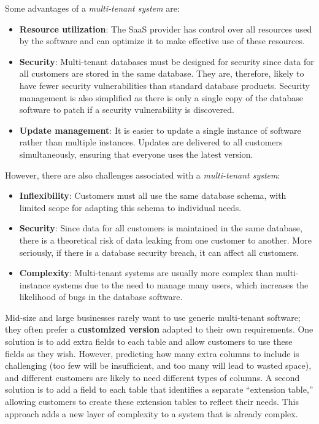 \noindent
Some advantages of a \textit{multi-tenant system} are:
\begin{itemize}
    \item \textbf{Resource utilization}: The SaaS provider has control over all resources used by the software and can optimize it to make effective use of these resources.
    \item \textbf{Security}: Multi-tenant databases must be designed for security since data for all customers are stored in the same database. They are, therefore, likely to have fewer security vulnerabilities than standard database products. Security management is also simplified as there is only a single copy of the database software to patch if a security vulnerability is discovered.
    \item \textbf{Update management}: It is easier to update a single instance of software rather than multiple instances. Updates are delivered to all customers simultaneously, ensuring that everyone uses the latest version.
\end{itemize}

\noindent
However, there are also challenges associated with a \textit{multi-tenant system}:
\begin{itemize}
    \item \textbf{Inflexibility}: Customers must all use the same database schema, with limited scope for adapting this schema to individual needs.
    \item \textbf{Security}: Since data for all customers is maintained in the same database, there is a theoretical risk of data leaking from one customer to another. More seriously, if there is a database security breach, it can affect all customers.
    \item \textbf{Complexity}: Multi-tenant systems are usually more complex than multi-instance systems due to the need to manage many users, which increases the likelihood of bugs in the database software.
\end{itemize}

Mid-size and large businesses rarely want to use generic multi-tenant software; they often prefer a \textbf{customized version} adapted to their own requirements. One solution is to add extra fields to each table and allow customers to use these fields as they wish. However, predicting how many extra columns to include is challenging (too few will be insufficient, and too many will lead to wasted space), and different customers are likely to need different types of columns. A second solution is to add a field to each table that identifies a separate “extension table,” allowing customers to create these extension tables to reflect their needs. This approach adds a new layer of complexity to a system that is already complex.

